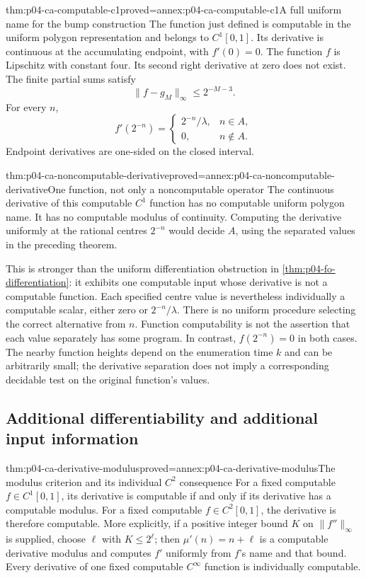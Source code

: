 \begin{hbtheorem}{thm:p04-ca-computable-c1}{proved=annex:p04-ca-computable-c1}{A full uniform name for the bump construction}
The function just defined is computable in the uniform polygon
representation and belongs to \(C^1[0,1]\).
Its derivative is continuous at the accumulating endpoint, with
\(f'(0)=0\). The function \(f\) is Lipschitz with constant four.
Its second right derivative at zero does not exist.
The finite partial sums satisfy
\[
 \lVert f-g_M\rVert_\infty\leq2^{-M-3}.
\]
For every \(n\),
\[
 f'(2^{-n})=
 \begin{cases}2^{-n}/\lambda,&n\in A,\\0,&n\notin A.
 \end{cases}
\]
Endpoint derivatives are one-sided on the closed interval.
\end{hbtheorem}

\begin{hbtheorem}{thm:p04-ca-noncomputable-derivative}{proved=annex:p04-ca-noncomputable-derivative}{One function, not only a noncomputable operator}
The continuous derivative of this computable \(C^1\) function has no
computable uniform polygon name. It has no computable modulus of
continuity. Computing the derivative uniformly at the rational centres
\(2^{-n}\) would decide \(A\), using the separated values in the
preceding theorem.
\end{hbtheorem}

This is stronger than the uniform differentiation obstruction in
\cref{thm:p04-fo-differentiation}: it exhibits one computable input whose
derivative is not a computable function. Each specified centre value is
nevertheless individually a computable scalar, either zero or
\(2^{-n}/\lambda\). There is no uniform procedure selecting the correct
alternative from \(n\). Function computability is not the assertion that
each value separately has some program.
In contrast, \(f(2^{-n})=0\) in both cases. The nearby function heights
depend on the enumeration time \(k\) and can be arbitrarily small;
the derivative separation does not imply a corresponding decidable
test on the original function's values.

\subsection{Additional differentiability and additional input information}
\label{sec:p04-ca-higher-derivatives}

\begin{hbtheorem}{thm:p04-ca-derivative-modulus}{proved=annex:p04-ca-derivative-modulus}{The modulus criterion and its individual \(C^2\) consequence}
For a fixed computable \(f\in C^1[0,1]\), its derivative is
computable if and only if its derivative has a computable modulus.
For a fixed computable \(f\in C^2[0,1]\), the derivative is therefore
computable. More explicitly, if a positive integer bound \(K\) on
\(\lVert f''\rVert_\infty\) is supplied, choose \(\ell\) with
\(K\leq2^\ell\); then \(\mu'(n)=n+\ell\) is a computable
derivative modulus and computes \(f'\) uniformly from \(f\)'s name
and that bound. Every derivative of one fixed computable \(C^\infty\)
function is individually computable.
\end{hbtheorem}

